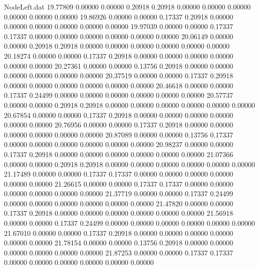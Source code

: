 \begin{filecontents}{NodeLeft.dat}
  19.77809    0.00000    0.00000     0.20918    0.20918    0.00000    0.00000    0.00000    0.00000    0.00000    0.00000
  19.86926    0.00000    0.00000     0.17337    0.20918    0.00000    0.00000    0.00000    0.00000    0.00000    0.00000
  19.97039    0.00000    0.00000     0.17337    0.17337    0.00000    0.00000    0.00000    0.00000    0.00000    0.00000
  20.06149    0.00000    0.00000     0.20918    0.20918    0.00000    0.00000    0.00000    0.00000    0.00000    0.00000
  20.18274    0.00000    0.00000     0.17337    0.20918    0.00000    0.00000    0.00000    0.00000    0.00000    0.00000
  20.27361    0.00000    0.00000     0.13756    0.20918    0.00000    0.00000    0.00000    0.00000    0.00000    0.00000
  20.37519    0.00000    0.00000     0.17337    0.20918    0.00000    0.00000    0.00000    0.00000    0.00000    0.00000
  20.46618    0.00000    0.00000     0.17337    0.24499    0.00000    0.00000    0.00000    0.00000    0.00000    0.00000
  20.57737    0.00000    0.00000     0.20918    0.20918    0.00000    0.00000    0.00000    0.00000    0.00000    0.00000
  20.67854    0.00000    0.00000     0.17337    0.20918    0.00000    0.00000    0.00000    0.00000    0.00000    0.00000
  20.76956    0.00000    0.00000     0.17337    0.20918    0.00000    0.00000    0.00000    0.00000    0.00000    0.00000
  20.87089    0.00000    0.00000     0.13756    0.17337    0.00000    0.00000    0.00000    0.00000    0.00000    0.00000
  20.98237    0.00000    0.00000     0.17337    0.20918    0.00000    0.00000    0.00000    0.00000    0.00000    0.00000
  21.07366    0.00000    0.00000     0.20918    0.20918    0.00000    0.00000    0.00000    0.00000    0.00000    0.00000
  21.17489    0.00000    0.00000     0.17337    0.17337    0.00000    0.00000    0.00000    0.00000    0.00000    0.00000
  21.26615    0.00000    0.00000     0.17337    0.17337    0.00000    0.00000    0.00000    0.00000    0.00000    0.00000
  21.37719    0.00000    0.00000     0.17337    0.24499    0.00000    0.00000    0.00000    0.00000    0.00000    0.00000
  21.47820    0.00000    0.00000     0.17337    0.20918    0.00000    0.00000    0.00000    0.00000    0.00000    0.00000
  21.56918    0.00000    0.00000     0.17337    0.24499    0.00000    0.00000    0.00000    0.00000    0.00000    0.00000
  21.67010    0.00000    0.00000     0.17337    0.20918    0.00000    0.00000    0.00000    0.00000    0.00000    0.00000
  21.78154    0.00000    0.00000     0.13756    0.20918    0.00000    0.00000    0.00000    0.00000    0.00000    0.00000
  21.87253    0.00000    0.00000     0.17337    0.17337    0.00000    0.00000    0.00000    0.00000    0.00000    0.00000

\end{filecontents}
